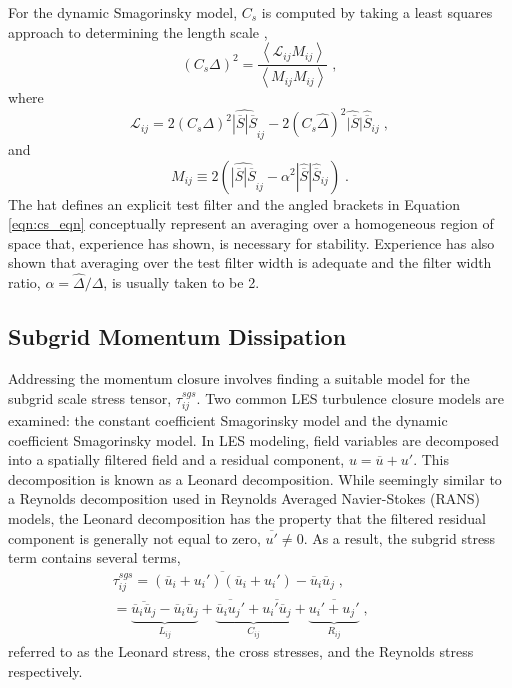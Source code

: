 For the dynamic Smagorinsky model, $C_s$ is computed by taking a least squares approach to determining the length scale \cite{Lilly180},
%
\begin{equation} \label{eqn:cs_eqn}
(C_s \Delta)^2 = \frac{ \left< \mathcal{L}_{ij} M_{ij} \right>}{ \left< M_{ij}M_{ij} \right> } \; ,
\end{equation}
%
where
%
%
\begin{equation}
\mathcal{L}_{ij} = 2( C_s \Delta)^2 \widehat{ |\overline{S} | \overline{S} }_{ij} - 
   2( C_s \widehat{\Delta})^2 \widehat{ |\overline{S}} | \widehat{\overline{S}}_{ij} \; ,
\end{equation}
%   
and
\begin{equation}
M_{ij} \equiv 2 \left( \widehat{ | \overline{S} | \overline{S} }_{ij} - \alpha^2 |\widehat{\overline{S}}|\widehat{\overline{S}}_{ij} \right) \; .
\end{equation} 
%
The hat defines an explicit test filter and the angled brackets in Equation \ref{eqn:cs_eqn} conceptually represent an averaging over a homogeneous region of space that, experience has shown, is necessary for stability.  Experience has also shown that averaging over the test filter width is adequate and the filter width ratio, $\alpha = \widehat{\Delta}/\Delta$, is usually taken to be 2.

\subsection{Subgrid Momentum Dissipation}
Addressing the momentum closure involves finding a suitable model for the subgrid scale stress tensor, $\tau^{sgs}_{ij}$.  Two common LES turbulence closure models are examined: the constant coefficient Smagorinsky model and the dynamic coefficient Smagorinsky model.  
In LES modeling, field variables are decomposed into a spatially filtered field and a residual component, $u = \overline{u} + u'$.  This decomposition is known as a Leonard decomposition.  While seemingly similar to a Reynolds decomposition used in Reynolds Averaged Navier-Stokes (RANS) models, the Leonard decomposition has the property that the filtered residual component is generally not equal to zero, $\overline{u'} \neq 0$.  As a result, the subgrid stress term contains several terms, 
\begin{eqnarray}
\tau_{ij}^{sgs} = \overline{ \left(\overline{u}_i + u_i' \right) \left(\overline{u}_i + u_i' \right)} - \overline{u}_i \overline{u}_j \; , \; \; \; \; \; \; \; \; \; \; \; \; \; \;  \; \; \nonumber \\
= \underbrace{\overline{\overline{u}_i \overline{u}_j} - \overline{u}_i \overline{u}_j}_{L_{ij}}  + 
   \underbrace{\overline{\overline{u}_i {u}_j'} + \overline{{u}_i' \overline{u}_j}}_{C_{ij}} + 
   \underbrace{ \overline{u_i' + u_j'} }_{R_{ij}} \; , 
\end{eqnarray}
%
referred to as the Leonard stress, the cross stresses, and the Reynolds stress respectively.  

